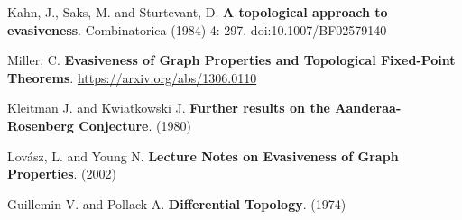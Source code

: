 \documentclass[a4paper]{article}
\begin{document}
\begin{thebibliography}{10}
Kahn, J., Saks, M. and Sturtevant, D. \textbf{A topological approach to evasiveness}. Combinatorica (1984) 4: 297. doi:10.1007/BF02579140

Miller, C. \textbf{ Evasiveness of Graph Properties and Topological Fixed-Point Theorems}. \url{https://arxiv.org/abs/1306.0110}

Kleitman J. and Kwiatkowski J. \textbf{Further results on the Aanderaa-Rosenberg Conjecture}. (1980)

Lovász, L. and Young N. \textbf{Lecture Notes on Evasiveness of Graph Properties}. (2002)

Guillemin V. and Pollack A. \textbf{Differential Topology}. (1974)

\end{thebibliography}
\end{document}
